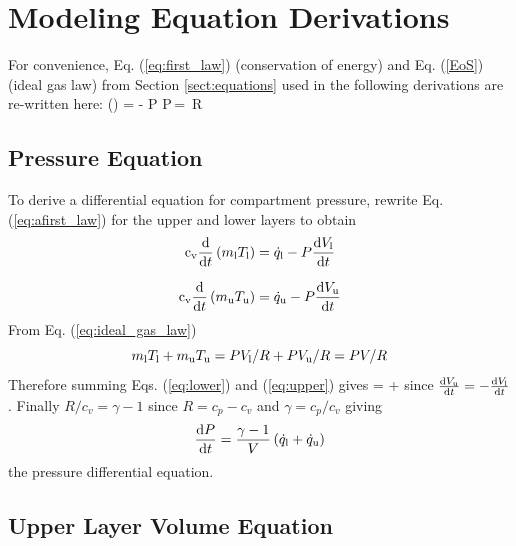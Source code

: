 \documentclass[12pt,twoside]{book}
\begin{document}
%
%

\chapter{Modeling Equation Derivations}
\label{chap:derivation}

For convenience, Eq. (\ref{eq:first_law}) (conservation of energy) and Eq. (\ref{EoS}) (ideal gas law) from Section \ref{sect:equations} used in the following derivations are re-written here:
\be
   \ddt\left(\cv \mi \Ti\right)   =  \dqi - P \dbydt{\Vi}\label{eq:afirst_law}
\ee
\be
  P\,\Vi = \mi\,R \, \Ti \label{eq:ideal_gas_law}
\ee

\section{Pressure Equation}


To derive a differential equation for compartment pressure, rewrite Eq. (\ref{eq:afirst_law}) for the upper and lower layers to obtain
\begin{align}
   {\mathrm{c}}\sb{\mathrm{v}}\frac{\mathrm{d}}{\mathrm{d} t}\left( m\sb{\mathrm{l}} T\sb{\mathrm{l}}\right)  &=\dot{q}\sb{\mathrm{l}} - P \frac{\mathrm{d} {V\sb{\mathrm{l}}}}{\mathrm{d} t}\label{eq:lower}\\[.1in]
   {\mathrm{c}}\sb{\mathrm{v}}\frac{\mathrm{d}}{\mathrm{d} t}\left( m\sb{\mathrm{u}} T\sb{\mathrm{u}}\right)  &=\dot{q}\sb{\mathrm{u}} -  P \frac{\mathrm{d} {V\sb{\mathrm{u}}}}{\mathrm{d} t}\label{eq:upper}
\end{align}
From Eq. (\ref{eq:ideal_gas_law})
\begin{equation}
m\sb{\mathrm{l}} T\sb{\mathrm{l}}+m\sb{\mathrm{u}} T\sb{\mathrm{u}}=PV\sb{\mathrm{l}}/R+PV\sb{\mathrm{u}}/R=PV/R
\end{equation}
Therefore summing Eqs. (\ref{eq:lower}) and (\ref{eq:upper}) gives
\be
     =  \dql + \dqu
\ee
since $\frac{\mathrm{d} {V\sb{\mathrm{u}}}}{\mathrm{d} t}=-\frac{\mathrm{d} {V\sb{\mathrm{l}}}}{\mathrm{d} t}$.  Finally $R/c_v=\gamma-1$ since $R=c_p-c_v$ and $\gamma=c_p/c_v$ giving
\begin{equation}
   \frac{\mathrm{d} { P}}{\mathrm{d} t}  =\frac{\gamma-1}{V}\left(\dot{q}\sb{\mathrm{l}} + \dot{q}\sb{\mathrm{u}}\right)
   \label{eq:ODE_P}
\end{equation}
the pressure differential equation.

\section{Upper Layer Volume Equation}
\end{document}
